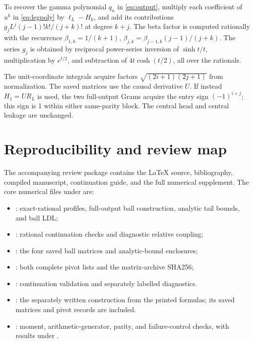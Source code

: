 \documentclass[11pt]{article}
\numberwithin{equation}{section}
\theoremstyle{definition}
\theoremstyle{remark}
\begin{document}
To recover the gamma polynomial $q_n$ in \eqref{eq:output}, multiply each
coefficient of $u^k$ in \eqref{eq:legpoly} by $\ell_L-H_k$, and add
its contributions $g_jL^j(j-1)!k!/(j+k)!$ at degree $k+j$.
The beta factor is computed rationally with the recurrence
$\beta_{1,k}=1/(k+1)$,
$\beta_{j,k}=\beta_{j-1,k}(j-1)/(j+k)$.
The series $g_j$ is obtained by reciprocal power-series inversion of
$\sinh t/t$, multiplication by $e^{t/2}$, and subtraction of
$4t\cosh(t/2)$, all over the rationals.

The unit-coordinate integrals acquire factors $\sqrt{(2i+1)(2j+1)}$ from
normalization. The saved matrices use the causal derivative $U$.
If instead $H_1=UR_L$ is used, the two full-output Grams acquire the
entry sign $(-1)^{i+j}$; this sign is 1 within either same-parity block.
The central head and central leakage are unchanged.

\section{Reproducibility and review map}\label{app:reproduce}

The accompanying review package contains the LaTeX source, bibliography,
compiled manuscript, continuation guide, and the full numerical supplement.
The core numerical files under  are:
\begin{itemize}
\item {}: exact-rational profiles, full-output ball
  construction, analytic tail bounds, and ball LDL;
\item {}: rational continuation checks and
  diagnostic relative coupling;
\item {}: the four saved ball matrices and
  analytic-bound enclosures;
\item {}: both complete pivot lists and
  the matrix-archive SHA256;
\item {}: continuation validation and separately labelled
  diagnostics.
\item {}: the separately written construction from
  the printed formulas; its saved matrices and pivot records are included.
\item {}: moment, arithmetic-generator, parity, and
  failure-control checks, with results under .
\end{itemize}
\end{document}
